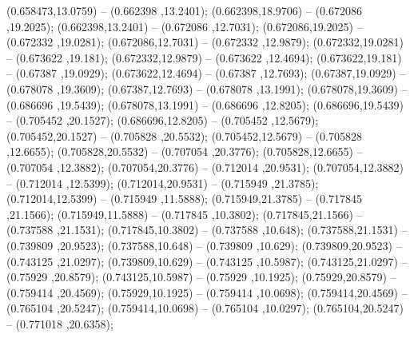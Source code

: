  (0.658473,13.0759) -- (0.662398 ,13.2401);
 (0.662398,18.9706) -- (0.672086 ,19.2025);
 (0.662398,13.2401) -- (0.672086 ,12.7031);
 (0.672086,19.2025) -- (0.672332 ,19.0281);
 (0.672086,12.7031) -- (0.672332 ,12.9879);
 (0.672332,19.0281) -- (0.673622 ,19.181);
 (0.672332,12.9879) -- (0.673622 ,12.4694);
 (0.673622,19.181) -- (0.67387 ,19.0929);
 (0.673622,12.4694) -- (0.67387 ,12.7693);
 (0.67387,19.0929) -- (0.678078 ,19.3609);
 (0.67387,12.7693) -- (0.678078 ,13.1991);
 (0.678078,19.3609) -- (0.686696 ,19.5439);
 (0.678078,13.1991) -- (0.686696 ,12.8205);
 (0.686696,19.5439) -- (0.705452 ,20.1527);
 (0.686696,12.8205) -- (0.705452 ,12.5679);
 (0.705452,20.1527) -- (0.705828 ,20.5532);
 (0.705452,12.5679) -- (0.705828 ,12.6655);
 (0.705828,20.5532) -- (0.707054 ,20.3776);
 (0.705828,12.6655) -- (0.707054 ,12.3882);
 (0.707054,20.3776) -- (0.712014 ,20.9531);
 (0.707054,12.3882) -- (0.712014 ,12.5399);
 (0.712014,20.9531) -- (0.715949 ,21.3785);
 (0.712014,12.5399) -- (0.715949 ,11.5888);
 (0.715949,21.3785) -- (0.717845 ,21.1566);
 (0.715949,11.5888) -- (0.717845 ,10.3802);
 (0.717845,21.1566) -- (0.737588 ,21.1531);
 (0.717845,10.3802) -- (0.737588 ,10.648);
 (0.737588,21.1531) -- (0.739809 ,20.9523);
 (0.737588,10.648) -- (0.739809 ,10.629);
 (0.739809,20.9523) -- (0.743125 ,21.0297);
 (0.739809,10.629) -- (0.743125 ,10.5987);
 (0.743125,21.0297) -- (0.75929 ,20.8579);
 (0.743125,10.5987) -- (0.75929 ,10.1925);
 (0.75929,20.8579) -- (0.759414 ,20.4569);
 (0.75929,10.1925) -- (0.759414 ,10.0698);
 (0.759414,20.4569) -- (0.765104 ,20.5247);
 (0.759414,10.0698) -- (0.765104 ,10.0297);
 (0.765104,20.5247) -- (0.771018 ,20.6358);
